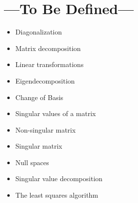 
\chapter{---To Be Defined---}\label{tbd}
\begin{itemize}
  \item Diagonalization
  \item Matrix decomposition
  \item Linear transformations
  \item Eigendecomposition
  \item Change of Basis
  \item Singular values of a matrix
  \item Non-singular matrix
  \item Singular matrix
  \item Null spaces
  \item Singular value decomposition
  \item The least squares algorithm
\end{itemize}